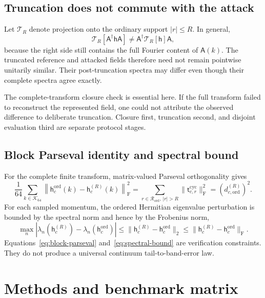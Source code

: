 \documentclass[11pt]{article}
\newcommand{\fro}{\mathrm{F}}
\newcommand{\mat}[1]{\mathsf{#1}}
\begin{document}
\subsection{Truncation does not commute with the attack}

Let $\mathcal T_R$ denote projection onto the ordinary support $|r|\le R$.  In general,
\begin{equation}
 \mathcal T_R[\mat A^{\dagger}\mat h\mat A]
 \ne \mat A^{\dagger}\mathcal T_R[\mat h]\mat A,
 \label{eq:noncommutation}
\end{equation}
because the right side still contains the full Fourier content of $\mat A(k)$.  The
truncated reference and attacked fields therefore need not remain pointwise unitarily
similar.  Their post-truncation spectra may differ even though their complete spectra
agree exactly.

The complete-transform closure check is essential here.  If the full transform failed
to reconstruct the represented field, one could not attribute the observed difference
to deliberate truncation.  Closure first, truncation second, and disjoint evaluation
third are separate protocol stages.

\subsection{Block Parseval identity and spectral bound}

For the complete finite transform, matrix-valued Parseval orthogonality gives
\begin{equation}
 \frac1{64}\sum_{k\in\mathcal K_{64}}
 \left\|\mat h_c^{\mathrm{ord}}(k)-\mat h_c^{(R)}(k)\right\|_{\fro}^2
 =\sum_{r\in\mathcal R_{\mathrm{ord}},\,|r|>R}
 \|\mat t_{c,r}^{\mathrm{cyc}}\|_{\fro}^2
 =\left(d_{c,\mathrm{ord}}^{(R)}\right)^2.
 \label{eq:block-parseval}
\end{equation}
For each sampled momentum, the ordered Hermitian eigenvalue perturbation is bounded by
the spectral norm and hence by the Frobenius norm,
\begin{equation}
 \max_n|\lambda_n(\mat h_c^{(R)})-\lambda_n(\mat h_c^{\mathrm{ord}})|
 \le \|\mat h_c^{(R)}-\mat h_c^{\mathrm{ord}}\|_2
 \le \|\mat h_c^{(R)}-\mat h_c^{\mathrm{ord}}\|_{\fro}.
 \label{eq:spectral-bound}
\end{equation}
Equations~\eqref{eq:block-parseval} and~\eqref{eq:spectral-bound} are verification
constraints.  They do not produce a universal continuum tail-to-band-error law.

\section{Methods and benchmark matrix}
\end{document}
